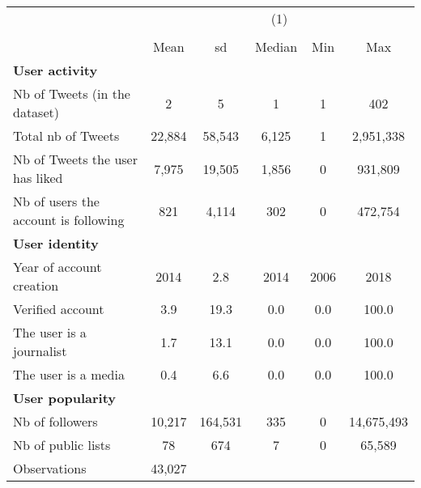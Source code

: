 {
\def\sym#1{\ifmmode^{#1}\else\(^{#1}\)\fi}
\begin{tabular}{l*{1}{ccccc}}
\hline\hline
                    &\multicolumn{5}{c}{(1)}                                         \\
                    &\multicolumn{5}{c}{}                                            \\
                    &        Mean&          sd&      Median&         Min&         Max\\
\hline
\textbf{User activity}&            &            &            &            &            \\
Nb of Tweets (in the dataset)&           2&           5&           1&           1&         402\\
Total nb of Tweets  &      22,884&      58,543&       6,125&           1&   2,951,338\\
Nb of Tweets the user has liked&       7,975&      19,505&       1,856&           0&     931,809\\
Nb of users the account is following&         821&       4,114&         302&           0&     472,754\\
\textbf{User identity}&            &            &            &            &            \\
Year of account creation&        2014&         2.8&        2014&        2006&        2018\\
Verified account    &         3.9&        19.3&         0.0&         0.0&       100.0\\
The user is a journalist&         1.7&        13.1&         0.0&         0.0&       100.0\\
The user is a media &         0.4&         6.6&         0.0&         0.0&       100.0\\
\textbf{User popularity}&            &            &            &            &            \\
Nb of followers     &      10,217&     164,531&         335&           0&  14,675,493\\
Nb of public lists  &          78&         674&           7&           0&      65,589\\
\hline
Observations        &      43,027&            &            &            &            \\
\hline\hline
\end{tabular}
}
